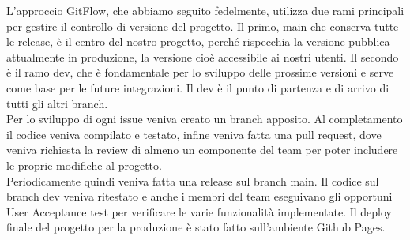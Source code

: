         L’approccio GitFlow, che abbiamo seguito fedelmente, utilizza due rami principali per gestire il controllo di versione del progetto. Il primo, main che conserva tutte le release, è il centro del nostro progetto, perché rispecchia la versione pubblica attualmente in produzione, la versione cioè accessibile ai nostri utenti. Il secondo è il ramo dev, che è fondamentale per lo sviluppo delle prossime versioni e serve come base per le future integrazioni. Il dev è il punto di partenza e di arrivo di tutti gli altri branch.\\
    Per lo sviluppo di ogni issue veniva creato un branch apposito. Al completamento il codice veniva compilato e testato, infine veniva fatta una pull request, dove veniva richiesta la review di almeno un componente del team per poter includere le proprie modifiche al progetto.\\
    Periodicamente quindi veniva fatta una release sul branch main. Il codice sul branch dev veniva ritestato e anche i membri del team eseguivano gli opportuni User Acceptance test per verificare le varie funzionalità implementate. 
    Il deploy finale del progetto per la produzione è stato fatto sull'ambiente Github Pages.
   
        
        





